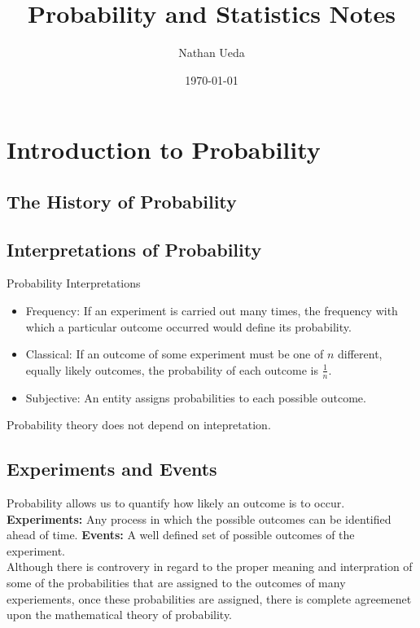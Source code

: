 \documentclass[11pt]{article}
\title{Probability and Statistics Notes}
\author{Nathan Ueda}
\date{\today}
\begin{document}
\maketitle 
\pagebreak
\tableofcontents 
\pagebreak

\section{Introduction to Probability}
\subsection{The History of Probability}
\subsection{Interpretations of Probability}

Probability Interpretations
\begin{itemize}
    \item Frequency: If an experiment is carried out many times, the frequency with which a
    particular outcome occurred would define its probability.
    \item Classical: If an outcome of some experiment must be one of $n$ different, equally
    likely outcomes, the probability of each outcome is $\frac{1}{n}$.
    \item Subjective: An entity assigns probabilities to each possible outcome.
\end{itemize}

Probability theory does not depend on intepretation.

\subsection{Experiments and Events}

Probability allows us to quantify how likely an outcome is to occur. \\

\textbf{Experiments:} Any process in which the possible outcomes can be identified ahead of time.
\textbf{Events:} A well defined set of possible outcomes of the experiment. \\

Although there is controvery in regard to the proper meaning and interpration of some of the
probabilities that are assigned to the outcomes of many experiements, once these probabilities
are assigned, there is complete agreemenet upon the mathematical theory of probability. \\
\end{document}
